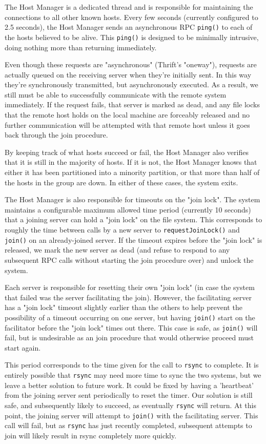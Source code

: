 The Host Manager is a dedicated thread and is responsible for maintaining the
connections to all other known hosts. Every few seconds (currently configured to
2.5 seconds), the Host Manager sends an asynchronous RPC \texttt{ping()} to each
of the hosts believed to be alive. This \texttt{ping()} is designed to be
minimally intrusive, doing nothing more than returning immediately.

Even though these requests are "asynchronous" (Thrift's "oneway"), requests are
actually queued on the receiving server when they're initially sent. In this
way they're synchronously transmitted, but asynchronously executed. As a
result, we still must be able to successfully communicate with the remote
system immediately. If the request fails, that server is marked as dead, and
any file locks that the remote host holds on the local machine are forceably
released and no further communication will be attempted with that remote host
unless it goes back through the join procedure.

By keeping track of what hosts succeed or fail, the Host Manager also verifies 
that it is still in the majority of hosts. If it is not, the Host Manager knows
that either it has been partitioned into a minority partition, or that more
than half of the hosts in the group are down. In either of these cases, the
system exits.

The Host Manager is also responsible for timeouts on the "join lock". The
system maintains a configurable maximum allowed time period (currently 10
seconds) that a joining server can hold a "join lock" on the file system. This
corresponds to roughly the time between calls by a new server to
\texttt{requestJoinLock()} and \texttt{join()} on an already-joined server. If
the timeout expires before the "join lock" is released, we mark the new server
as dead (and refuse to respond to any subsequent RPC calls without
starting the join procedure over) and unlock the system.

Each server is responsible for resetting their own "join lock" (in case the
system that failed was the server facilitating the join). However, the
facilitating server has a "join lock" timeout slightly earlier than the others
to help prevent the possibility of a timeout occurring on one server, but having
\texttt{join()} start on the facilitator before the "join lock" times out there.
This case is safe, as \texttt{join()} will fail, but is undesirable as an
join procedure that would otherwise proceed must start again.

This period corresponds to the time given for the call to \texttt{rsync} to
complete. It is entirely possible that \texttt{rsync} may need more time to
sync the two systems, but we leave a better solution to future work.
It could be fixed by having a 'heartbeat' from the joining server sent
periodically to reset the timer. Our solution is still safe, and subsequently
likely to succeed, as eventually \texttt{rsync} will return. At this point, the
joining server will attempt to \texttt{join()} with the facilitating server.
This call will fail, but as \texttt{rsync} has just recently completed,
subsequent attempts to join will likely result in rsync completely more
quickly.


